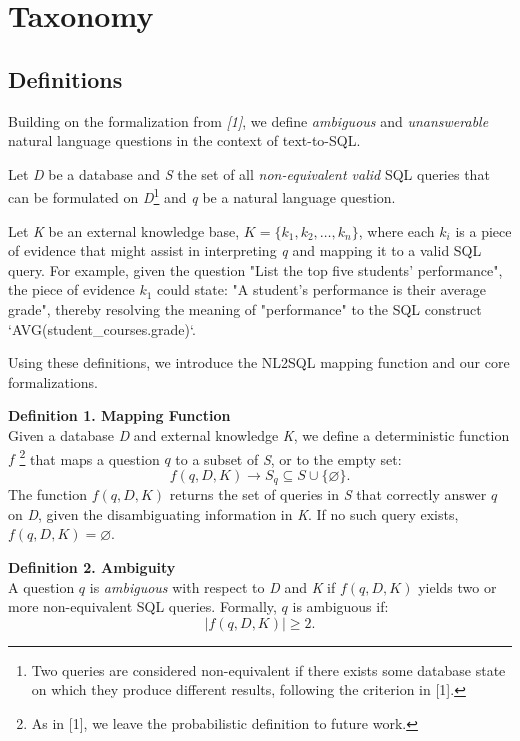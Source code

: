 \section{Taxonomy}
\subsection{Definitions}

Building on the formalization from \textit{[1]}, we define \textit{ambiguous} and \emph{unanswerable} natural language questions in the context of text-to-SQL.

Let \textit{D} be a database and \textit{S} the set of all \textit{non-equivalent valid} SQL queries that can be formulated on \textit{D}\footnote{Two queries are considered non-equivalent if there exists some database state on which they produce different results, following the criterion in [1].} and \textit{q} be a natural language question.

Let \textit{K} be an external knowledge base, \(\textit{K} = \{k_1, k_2, \ldots, k_n\}\), where each \(k_i\) is a piece of evidence that might assist in interpreting \textit{q} and mapping it to a valid SQL query. For example, given the question "List the top five students' performance", the piece of evidence \(k_1\) could state: "A student's performance is their average grade", thereby resolving the meaning of "performance" to the SQL construct `AVG(student\_courses.grade)`.

Using these definitions, we introduce the NL2SQL mapping function and our core formalizations.

\textbf{Definition 1. Mapping Function} \\
Given a database \textit{D} and external knowledge \textit{K}, we define a deterministic function \(f\) \footnote{As in [1], we leave the probabilistic definition to future work.} that maps a question \(q\) to a subset of \textit{S}, or to the empty set:
\[
f(q, D, K) \to S_q \subseteq S \cup \{\varnothing\}.
\]
The function \(f(q, D, K)\) returns the set of queries in \textit{S} that correctly answer \(q\) on \textit{D}, given the disambiguating information in \textit{K}. If no such query exists, \(f(q, D, K) = \varnothing\).

\textbf{Definition 2. Ambiguity} \\
A question \(q\) is \textit{ambiguous} with respect to \textit{D} and \textit{K} if \(f(q, D, K)\) yields two or more non-equivalent SQL queries. Formally, \(q\) is ambiguous if:
\[
\lvert f(q, D, K) \rvert \ge 2.
\]

